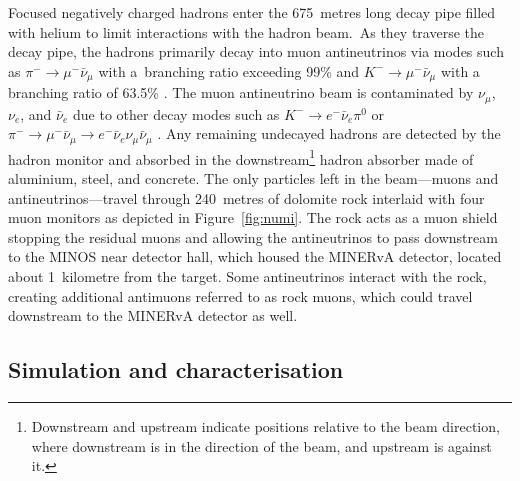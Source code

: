 Focused negatively charged hadrons enter the 675~metres long decay pipe filled with helium to limit interactions with the hadron beam.~As they traverse the decay pipe, the hadrons primarily decay into muon antineutrinos via modes such as $\pi^{-}\rightarrow \mu^{-}\bar{\nu}_{\mu}$ with a~branching ratio exceeding 99\% and $K^{-}\rightarrow \mu^{-}\bar{\nu}_{\mu}$ with a branching ratio of 63.5\% \cite{numi2016_ADAMSON2016279,Workman:2022ynf}. The muon antineutrino beam is contaminated by $\nu_{\mu}$, $\nu_{e}$, and $\bar{\nu}_{e}$ due to other decay modes such as $K^{-}\rightarrow e^{-}\bar{\nu}_{e}\pi^{0}$ or $\pi^{-}\rightarrow \mu^{-}\bar{\nu}_{\mu} \rightarrow e^{-}\bar{\nu}_{e}\nu_{\mu}\bar{\nu}_{\mu}$ \cite{Workman:2022ynf}. Any remaining undecayed hadrons are detected by the hadron monitor and absorbed in the downstream\footnote{Downstream and upstream indicate positions relative to the beam direction, where downstream is in the direction of the beam, and upstream is against it.} hadron absorber made of aluminium, steel, and concrete. The only particles left in the beam---muons and antineutrinos---travel through 240~metres of dolomite rock interlaid  with four muon monitors as depicted in Figure~\ref{fig:numi}.\enlargethispage{2\baselineskip} 
The rock acts as a muon shield stopping the residual muons and allowing the antineutrinos to pass downstream to the MINOS near detector hall, which housed the MINERvA detector, located about 1~kilometre from the target. Some antineutrinos interact with the rock, creating additional antimuons referred to as rock muons, which could travel downstream to the MINERvA detector as well.



\subsection{Simulation and characterisation}\label{subsec:numiSim}

